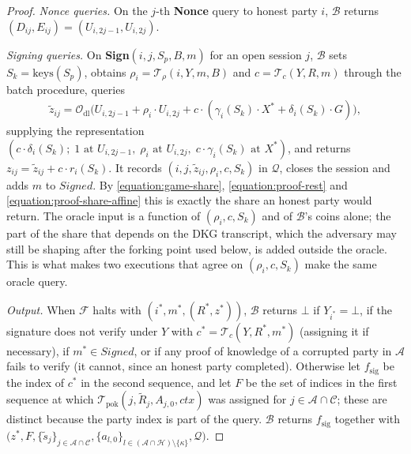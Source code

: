 \documentclass{article}
\theoremstyle{plain}
\theoremstyle{definition}
\theoremstyle{remark}
\begin{document}
\begin{proof}
  \emph{Nonce queries.}  On the $j$-th \textbf{Nonce} query to honest party $i$, $\mathcal{B}$ returns $(D_{ij}, E_{ij}) = (U_{i,2j-1}, U_{i,2j})$.

  \emph{Signing queries.}  On \textbf{Sign}$(i, j, S_p, B, m)$ for an open session $j$, $\mathcal{B}$ sets $S_k = \mathrm{keys}(S_p)$, obtains $\rho_i = \mathcal{T}_\rho(i, Y, m, B)$ and $c = \mathcal{T}_c(Y, R, m)$ through the batch procedure, queries
  \begin{align}\label{equation:proof-dl-query}
    \tilde{z}_{ij} = \mathcal{O}_{\mathrm{dl}}\big(U_{i,2j-1} + \rho_i \cdot U_{i,2j} + c \cdot (\gamma_i(S_k) \cdot X^* + \delta_i(S_k) \cdot G)\big),
  \end{align}
  supplying the representation $(c \cdot \delta_i(S_k); \; 1 \text{ at } U_{i,2j-1}, \; \rho_i \text{ at } U_{i,2j}, \; c \cdot \gamma_i(S_k) \text{ at } X^*)$, and returns $z_{ij} = \tilde{z}_{ij} + c \cdot r_i(S_k)$.  It records $(i, j, \tilde{z}_{ij}, \rho_i, c, S_k)$ in $\mathcal{Q}$, closes the session and adds $m$ to $\mathit{Signed}$.  By \eqref{equation:game-share}, \eqref{equation:proof-rest} and \eqref{equation:proof-share-affine} this is exactly the share an honest party would return.  The oracle input is a function of $(\rho_i, c, S_k)$ and of $\mathcal{B}$'s coins alone; the part of the share that depends on the DKG transcript, which the adversary may still be shaping after the forking point used below, is added outside the oracle.  This is what makes two executions that agree on $(\rho_i, c, S_k)$ make the same oracle query.

  \emph{Output.}  When $\mathcal{F}$ halts with $(i^*, m^*, (R^*, z^*))$, $\mathcal{B}$ returns $\bot$ if $Y_{i^*} = \bot$, if the signature does not verify under $Y$ with $c^* = \mathcal{T}_c(Y, R^*, m^*)$ (assigning it if necessary), if $m^* \in \mathit{Signed}$, or if any proof of knowledge of a corrupted party in $\mathcal{A}$ fails to verify (it cannot, since an honest party completed).  Otherwise let $f_{\mathrm{sig}}$ be the index of $c^*$ in the second sequence, and let $F$ be the set of indices in the first sequence at which $\mathcal{T}_{\mathrm{pok}}(j, \tilde{R}_j, A_{j,0}, \mathit{ctx})$ was assigned for $j \in \mathcal{A} \cap \mathcal{C}$; these are distinct because the party index is part of the query.  $\mathcal{B}$ returns $f_{\mathrm{sig}}$ together with $\big(z^*, F, \{\tilde{s}_j\}_{j \in \mathcal{A} \cap \mathcal{C}}, \{a_{l,0}\}_{l \in (\mathcal{A} \cap \mathcal{H}) \setminus \{\kappa\}}, \mathcal{Q}\big)$.


\end{proof}
\end{document}
